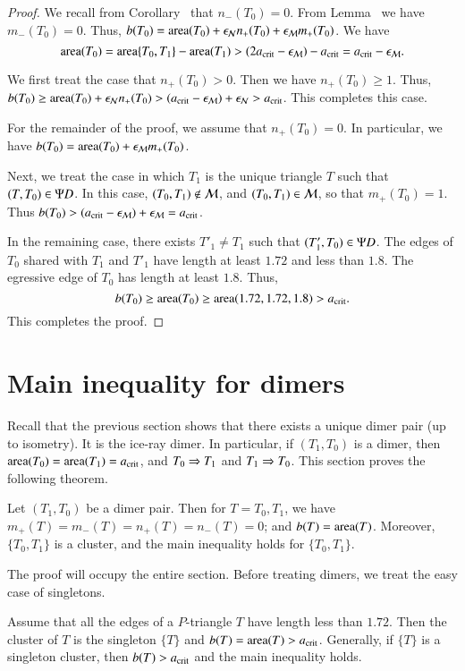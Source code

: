 \begin{proof}
  We recall from Corollary~ that $n_-(T_0)=0$.  From
  Lemma~ we have $m_-(T_0)=0$.  Thus, $b(T_0) =
  {\operatorname{area}}(T_0) + \epsilon_{\mathcal N} n_+(T_0) + \epsilon_{\mathcal M} m_+(T_0)$.  We have
\[
{\operatorname{area}}(T_0) = {\operatorname{area}}\{T_0,T_1\} - {\operatorname{area}}(T_1) 
> (2a_\text{crit}-\epsilon_{\mathcal M}) -a_\text{crit} = a_\text{crit} - \epsilon_{\mathcal M}.
\]

We first treat the case that $n_+(T_0)>0$.  Then we have $n_+(T_0)\ge
1$.  Thus, $b(T_0) \ge {\operatorname{area}}(T_0) + \epsilon_{\mathcal N} n_+(T_0) > (a_\text{crit} - \epsilon_{\mathcal M})
+ \epsilon_{\mathcal N} > a_\text{crit}$.  This completes this case.

For the remainder of the proof, we assume that $n_+(T_0)=0$.  In
particular, we have $b(T_0) = {\operatorname{area}}(T_0) + \epsilon_{\mathcal M} m_+(T_0)$.

Next, we treat the case in which $T_1$ is the unique triangle $T$ such
that $(T,T_0)\in\Psi D$.  In this case, $(T_0,T_1)\not\in\mathcal M$, and
$(T_0,T_1)\in\mathcal M$, so that $m_+(T_0)=1$.  Thus $b(T_0) > (a_\text{crit}-\epsilon_{\mathcal M})
+ \epsilon_{\mathcal M} = a_\text{crit}$.

In the remaining case, there exists $T'_1\ne T_1$ such that
$(T'_1,T_0)\in\Psi D$.  The edges of $T_0$ shared with $T_1$ and $T'_1$
have length at least $1.72$ and less than $1.8$.  The egressive edge
of $T_0$ has length at least $1.8$.  Thus,
\[
b(T_0) \ge {\operatorname{area}} (T_0) \ge {\operatorname{area}}(1.72,1.72,1.8) > a_\text{crit}.
\]
This completes the proof.
\end{proof}


\section{Main inequality for dimers}

Recall that the previous section shows that there exists a unique
dimer pair (up to isometry).  It is the ice-ray dimer.  In particular,
if $(T_1,T_0)$ is a dimer, then ${\operatorname{area}}(T_0)={\operatorname{area}}(T_1)=a_\text{crit}$, and
$T_0\Rightarrow T_1$ and $T_1\Rightarrow T_0$.  This section proves the following
theorem.

\begin{theorem} 
  Let $(T_1,T_0)$ be a dimer pair.  Then for $T=T_0,T_1$, we have
  $m_+(T)=m_-(T) = n_+(T)=n_-(T) = 0$; and $b(T) = {\operatorname{area}}(T)$.
  Moreover, $\{T_0,T_1\}$ is a cluster, and the main inequality holds
  for $\{T_0,T_1\}$.
\end{theorem}

The proof will occupy the entire section.  Before treating dimers, we
treat the easy case of singletons.

\begin{lemma}  
  Assume that all the edges of a $P$-triangle $T$ have length less
  than $1.72$.  Then the cluster of $T$ is the singleton $\{T\}$ and
  $b(T) ={\operatorname{area}}(T) > a_\text{crit}$.  Generally, if $\{T\}$ is a singleton
  cluster, then $b(T) > a_\text{crit}$ and the main inequality holds.
\end{lemma}

